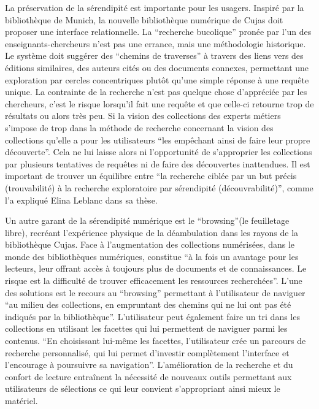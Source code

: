 La préservation de la sérendipité est importante pour les usagers. Inspiré par la bibliothèque de Munich, la nouvelle bibliothèque numérique de Cujas doit proposer une interface relationnelle. La \enquote{recherche bucolique} pronée par l'un des enseignants-chercheurs n'est pas une errance, mais une méthodologie historique. Le système doit suggérer des \enquote{chemins de traverses} à travers des liens vers des éditions similaires, des auteurs cités ou des documents connexes, permettant une exploration par cercles concentriques plutôt qu'une simple réponse à une requête unique. La contrainte de la recherche n'est pas quelque chose d'appréciée par les chercheurs, c'est le risque lorsqu'il fait une requête et que celle-ci retourne trop de résultats ou alors très peu. Si la vision des collections des experts métiers s'impose de trop dans la méthode de recherche concernant la vision des collections qu'elle a pour les utilisateurs \enquote{les empêchant ainsi de faire leur propre découverte}. Cela ne lui laisse alors ni l'opportunité de s'approprier les collections par plusieurs tentatives de requêtes ni de faire des découvertes inattendues. Il est important de trouver un équilibre entre \enquote{la recherche ciblée par un but précis (trouvabilité) à la recherche exploratoire par sérendipité (découvrabilité)}, comme l'a expliqué Elina Leblanc dans sa thèse. 

Un autre garant de la sérendipité numérique est le \enquote{browsing}(le feuilletage libre), recréant l'expérience physique de la déambulation dans les rayons de la bibliothèque Cujas. Face à l'augmentation des collections numérisées, dans le monde des bibliothèques numériques, constitue \enquote{à la fois un avantage pour les lecteurs, leur offrant accès à toujours plus de documents et de connaissances. Le risque est la difficulté de trouver efficacement les ressources recherchées}. L'une des solutions est le recours au \enquote{browsing} permettant à l'utilisateur de naviguer \enquote{au milieu des collections, en empruntant des chemins qui ne lui ont pas été indiqués par la bibliothèque}. L'utilisateur peut également faire un tri dans les collections en utilisant les facettes qui lui permettent de naviguer parmi les contenus. \enquote{En choisissant lui-même les facettes, l'utilisateur crée un parcours de recherche personnalisé, qui lui permet d'investir complètement l'interface et l'encourage à poursuivre sa navigation}. L'amélioration de la recherche et du confort de lecture entraînent la nécessité de nouveaux outils permettant aux utilisateurs de sélections ce qui leur convient s'appropriant ainsi mieux le matériel. 